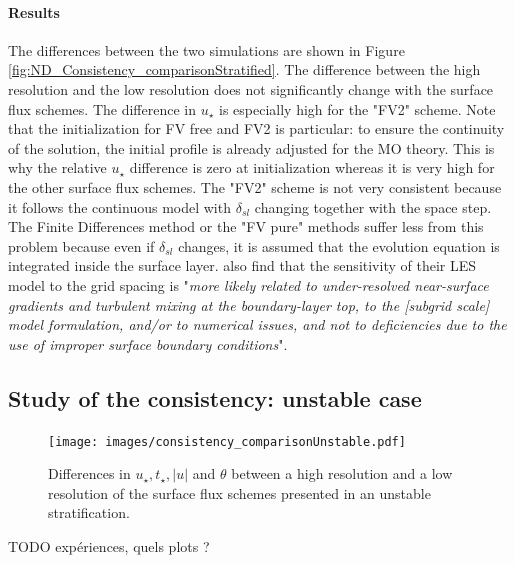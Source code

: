 \paragraph{Results} The differences between the two simulations are shown in Figure
\ref{fig:ND_Consistency_comparisonStratified}.
The difference between the high resolution and the low resolution
does not significantly change with the surface flux schemes.
The difference in $u_\star$ is especially high for the "FV2" scheme.
Note that the initialization for FV free and FV2 is particular:
to ensure the continuity of the solution,
the initial profile is already adjusted for the
MO theory. This is why the relative $u_\star$ difference is zero
at initialization whereas it is very high for the other surface flux
schemes.
%
The "FV2" scheme is not very consistent because it follows the
continuous model with $\delta_{sl}$ changing together with the
space step.
The Finite Differences method or the "FV pure" methods suffer
less from this problem because even if $\delta_{sl}$ changes,
it is assumed that the evolution equation is
integrated inside the surface layer.
\cite{maronga_improved_2020} also find that the
sensitivity of their LES model to the grid spacing is
"\textit{more
likely related to under-resolved near-surface gradients
and turbulent mixing at the boundary-layer top, to the
[subgrid scale] model formulation, and/or to numerical issues,
and not to deficiencies due to the use of improper surface
boundary conditions}".
\subsection{Study of the consistency: unstable case}
\begin{figure}
	\centering
	\texttt{[image: images/consistency\_comparisonUnstable.pdf]}
	\caption{Differences in $u_\star, t_\star, |u|$ and $\theta$
	between a high resolution and a low resolution
	of the surface flux schemes presented in an unstable
	stratification.
	}
	\label{fig:ND_Consistency_comparisonUnstable}
\end{figure}
{\color{red} TODO expériences, quels plots ?}
